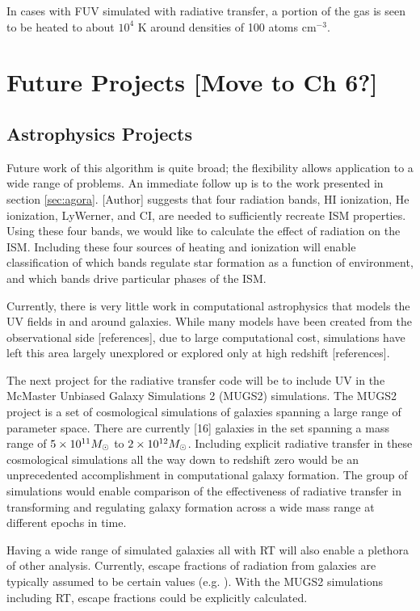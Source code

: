 In cases with FUV simulated with radiative transfer, a portion of the gas is seen to be heated to about $10^4$ K around densities of 100 atoms cm$^{-3}$.

\section{Future Projects [Move to Ch 6?]}
\label{sec:futurework}

\subsection{Astrophysics Projects}
\label{sec:astroprojects}

Future work of this algorithm is quite broad; the flexibility allows application to a wide range of problems. An immediate follow up is to the work presented in section \ref{sec:agora}. [Author] suggests that four radiation bands, HI ionization, He ionization, LyWerner, and CI, are needed to sufficiently recreate ISM properties. Using these four bands, we would like to calculate the effect of radiation on the ISM. Including these four sources of heating and ionization will enable classification of which bands regulate star formation as a function of environment, and which bands drive particular phases of the ISM.

Currently, there is very little work in computational astrophysics that models the UV fields in and around galaxies. While many models have been created from the observational side [references], due to large computational cost, simulations have left this area largely unexplored or explored only at high redshift [references].

The next project for the radiative transfer code will be to include UV in the McMaster Unbiased Galaxy Simulations 2 (MUGS2) simulations. The MUGS2 project is a set of cosmological simulations of galaxies spanning a large range of parameter space. There are currently [16] galaxies in the set spanning a mass range of $5\times 10^{11} M_{\odot}$ to $2\times 10^{12} M_{\odot}$. Including explicit radiative transfer in these cosmological simulations all the way down to redshift zero would be an unprecedented accomplishment in computational galaxy formation. The group of simulations would enable comparison of the effectiveness of radiative transfer in transforming and regulating galaxy formation across a wide mass range at different epochs in time.

Having a wide range of simulated galaxies all with RT will also enable a plethora of other analysis. Currently, escape fractions of radiation from galaxies are typically assumed to be certain values (e.g. \citet{kannanEt14}). With the MUGS2 simulations including RT, escape fractions could be explicitly calculated.

